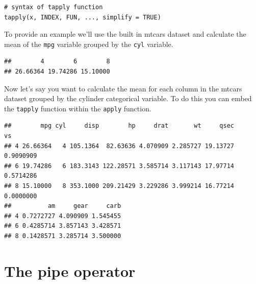 \documentclass[
]{book}
\newenvironment{Shaded}{\begin{snugshade}}{\end{snugshade}}
\newcommand{\ControlFlowTok}[1]{\textcolor[rgb]{0.13,0.29,0.53}{\textbf{#1}}}
\newcommand{\DecValTok}[1]{\textcolor[rgb]{0.00,0.00,0.81}{#1}}
\newcommand{\FunctionTok}[1]{\textcolor[rgb]{0.00,0.00,0.00}{#1}}
\newcommand{\NormalTok}[1]{#1}
\newcommand{\SpecialCharTok}[1]{\textcolor[rgb]{0.00,0.00,0.00}{#1}}
\begin{document}
\begin{verbatim}
# syntax of tapply function
tapply(x, INDEX, FUN, ..., simplify = TRUE)
\end{verbatim}

To provide an example we'll use the built in mtcars dataset and calculate the mean of the \texttt{mpg} variable grouped by the \texttt{cyl} variable.

\begin{Shaded}
\end{Shaded}

\begin{verbatim}
##        4        6        8 
## 26.66364 19.74286 15.10000
\end{verbatim}

Now let's say you want to calculate the mean for each column in the mtcars dataset grouped by the cylinder categorical variable. To do this you can embed the \texttt{tapply} function within the \texttt{apply} function.

\begin{Shaded}
\end{Shaded}

\begin{verbatim}
##        mpg cyl     disp        hp     drat       wt     qsec        vs
## 4 26.66364   4 105.1364  82.63636 4.070909 2.285727 19.13727 0.9090909
## 6 19.74286   6 183.3143 122.28571 3.585714 3.117143 17.97714 0.5714286
## 8 15.10000   8 353.1000 209.21429 3.229286 3.999214 16.77214 0.0000000
##          am     gear     carb
## 4 0.7272727 4.090909 1.545455
## 6 0.4285714 3.857143 3.428571
## 8 0.1428571 3.285714 3.500000
\end{verbatim}

\hypertarget{the-pipe-operator}{%
\section{The pipe operator}\label{the-pipe-operator}}
\end{document}
